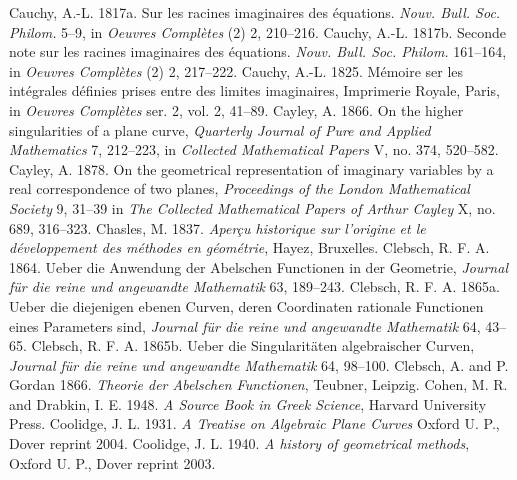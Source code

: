 \newline\indent Cauchy, A.-L. 1817a. Sur les racines imaginaires des \'equations. \emph{Nouv. Bull. Soc. Philom.} 5--9, in  \emph{Oeuvres Compl\`etes} (2) 2, 210--216.
 \newline\indent Cauchy, A.-L. 1817b. Seconde note sur les racines imaginaires des \'equa\-tions. \emph{Nouv. Bull. Soc. Philom.} 161--164, in \emph{Oeuvres Compl\`etes} (2) 2, 217--222.
 \newline\indent  Cauchy, A.-L. 1825. M\'emoire ser les int\'egrales d\'efinies prises  entre des limites imaginaires, Imprimerie Royale, Paris, in \emph{Oeuvres Compl\`etes} ser. 2, vol. 2, 41--89. 
\newline\indent Cayley, A. 1866. On the higher singularities of a plane curve, \emph{Quarterly Journal of Pure and Applied Mathematics} 7, 212--223, in \emph{Collected Mathematical Papers} V, no. 374, 520--582.
\newline\indent   Cayley, A. 1878. On the geometrical representation of imaginary variables by a real correspondence of two planes, \emph{Proceedings of the  London Mathematical Society} 9, 31--39 in \emph{The Collected Mathematical Papers of Arthur Cayley} X, no. 689, 316--323.
\newline\indent Chasles, M. 1837.  \emph{Aper\c{c}u historique sur l'origine et le d\'eveloppement des m\'ethodes en g\'eom\'etrie}, Hayez, Bruxelles. 
\newline\indent Clebsch, R. F. A. 1864.  Ueber die Anwendung der Abelschen Functionen in der Geometrie, \emph{Journal f\"ur die reine und angewandte Mathematik}  63, 189--243.
\newline\indent Clebsch, R. F. A. 1865a. Ueber die diejenigen ebenen Curven, deren Coordinaten rationale Functionen eines Parameters sind, \emph{Journal f\"ur die reine und angewandte Mathematik} 64, 43--65.
\newline\indent Clebsch, R. F. A. 1865b. Ueber die Singularit\"aten algebraischer Curven, \emph{Journal f\"ur die reine und angewandte Mathematik} 64, 98--100.
\newline\indent Clebsch, A. and P. Gordan 1866. \emph{Theorie der Abelschen Functionen}, Teubner, Leipzig.
\newline\indent Cohen, M. R. and Drabkin, I. E. 1948. \emph{A Source Book in Greek Science}, Harvard University Press.
\newline\indent Coolidge, J. L.  1931. \emph{A Treatise on Algebraic Plane Curves} Oxford U. P., Dover reprint 2004.
\newline\indent Coolidge, J. L.  1940.  \emph{A history of geometrical methods}, Oxford U. P., Dover reprint 2003.
